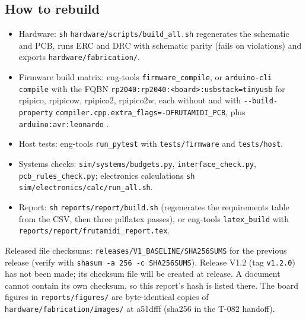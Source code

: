 \subsection{How to rebuild}
\begin{itemize}[noitemsep]
  \item Hardware: \nolinkurl{sh} \nolinkurl{hardware/scripts/build_all.sh} regenerates the
        schematic and PCB, runs ERC and DRC with schematic parity (fails on
        violations) and exports \nolinkurl{hardware/fabrication/}.
  \item Firmware build matrix: eng-tools \nolinkurl{firmware_compile}, or
        \texttt{arduino-cli compile} with the FQBN
        \nolinkurl{rp2040:rp2040:<board>:usbstack=tinyusb} for rpipico, rpipicow,
        rpipico2, rpipico2w, each without and with
        \nolinkurl{--build-property} \nolinkurl{compiler.cpp.extra_flags=-DFRUTAMIDI_PCB}, plus
        \nolinkurl{arduino:avr:leonardo} .
  \item Host tests: eng-tools \texttt{run\_pytest} with \texttt{tests/firmware}
        and \texttt{tests/host}.
  \item Systems checks: \nolinkurl{sim/systems/budgets.py},
        \nolinkurl{interface_check.py}, \nolinkurl{pcb_rules_check.py}; electronics
        calculations \nolinkurl{sh} \nolinkurl{sim/electronics/calc/run_all.sh}.
  \item Report: \nolinkurl{sh} \nolinkurl{reports/report/build.sh} (regenerates the requirements
        table from the CSV, then three pdflatex passes), or eng-tools
        \texttt{latex\_build} with \nolinkurl{reports/report/frutamidi_report.tex}.
\end{itemize}

Released file checksums: \nolinkurl{releases/V1_BASELINE/SHA256SUMS} for the previous
release (verify with \texttt{shasum -a 256 -c SHA256SUMS}). Release V1.2 (tag
\texttt{v1.2.0}) has not been made; its checksum file will be created at release. A
document cannot contain its own checksum, so this report's hash is listed there.
The board figures in \nolinkurl{reports/figures/} are byte-identical copies of
\nolinkurl{hardware/fabrication/images/} at a51dfff (sha256 in the T-082 handoff).
